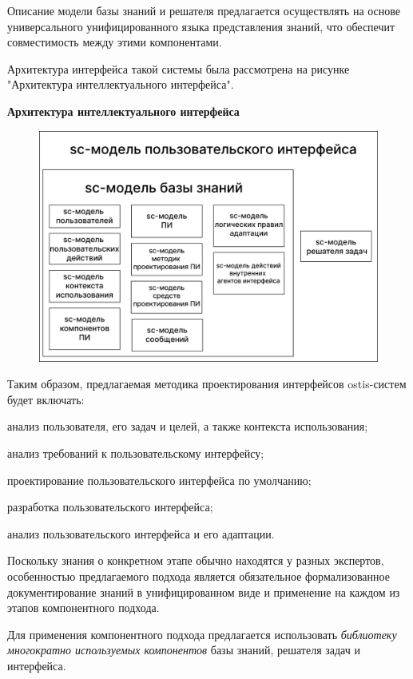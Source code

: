 Описание модели базы знаний и решателя предлагается осуществлять на основе универсального унифицированного языка представления знаний, что обеспечит совместимость между этими компонентами.

Архитектура интерфейса такой системы была рассмотрена на рисунке "Архитектура интеллектуального интерфейса"{}.

\textbf{Архитектура интеллектуального интерфейса}

\begin{figure}[h]
	\centering
	\includegraphics[scale=0.15]{images/part5/sc-model-ui.png}
\end{figure}

Таким образом, предлагаемая методика проектирования интерфейсов ostis-систем будет включать:
\begin{textitemize}
\item анализ пользователя, его задач и целей, а также контекста использования;
\item анализ требований к пользовательскому интерфейсу;
\item проектирование пользовательского интерфейса по умолчанию;
\item разработка пользовательского интерфейса;
\item анализ пользовательского интерфейса и его адаптации.
\end{textitemize}

Поскольку знания о конкретном этапе обычно находятся у разных экспертов, особенностью предлагаемого подхода является обязательное формализованное документирование знаний в унифицированном виде и применение на каждом из этапов компонентного подхода.

Для применения компонентного подхода предлагается использовать \textit{библиотеку многократно используемых компонентов} базы знаний, решателя задач и интерфейса.

